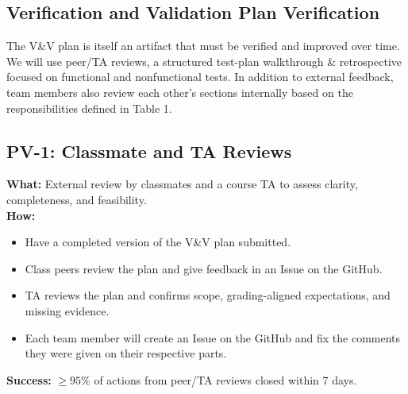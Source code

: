 \documentclass[12pt, titlepage]{article}
\begin{document}
\subsection{Verification and Validation Plan Verification}

The V\&V plan is itself an artifact that must be verified and improved over time. We will use
peer/TA reviews, a structured test-plan walkthrough \& retrospective focused on functional and nonfunctional tests. In addition to external feedback, team members also review each other’s sections internally based on the responsibilities defined in Table 1.

\subsection*{PV-1: Classmate and TA Reviews}
\textbf{What:} External review by classmates and a course TA to assess clarity, completeness, and feasibility. \\
\textbf{How:}
\begin{itemize}
  \item Have a completed version of the V\&V plan submitted.
  \item Class peers review the plan and give feedback in an Issue on the GitHub.
  \item TA reviews the plan and confirms scope, grading-aligned expectations, and missing evidence.
  \item Each team member will create an Issue on the GitHub and fix the comments they were given on their respective parts.
\end{itemize}
\textbf{Success:} $\geq 95\%$ of actions from peer/TA reviews closed within 7 days.
\end{document}
